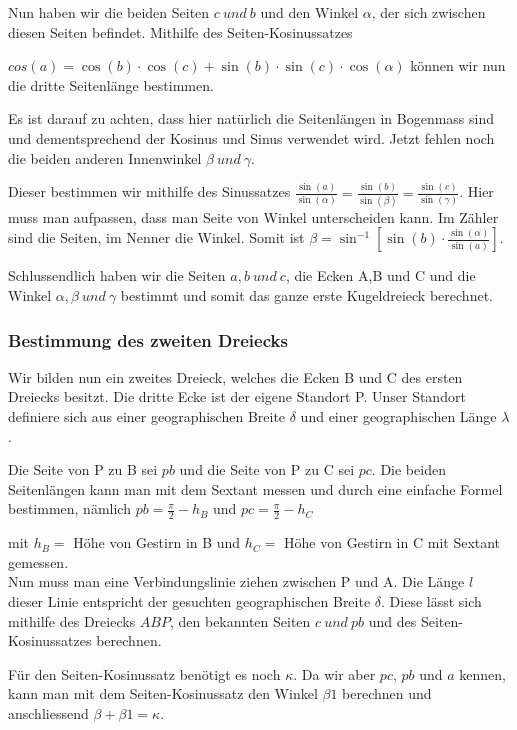 Nun haben wir die beiden Seiten $c\ und\ b$ und den Winkel $\alpha$, der sich zwischen diesen Seiten befindet. 
Mithilfe des Seiten-Kosinussatzes 

$cos(a) = \cos(b)\cdot \cos(c) + \sin(b) \cdot \sin(c)\cdot \cos(\alpha)$ können wir nun die dritte Seitenlänge bestimmen. 

Es ist darauf zu achten, dass hier natürlich die Seitenlängen in Bogenmass sind und dementsprechend der Kosinus und Sinus verwendet wird. 
Jetzt fehlen noch die beiden anderen Innenwinkel $\beta \ und\ \gamma$.

Dieser bestimmen wir mithilfe des Sinussatzes $\frac{\sin (a)}{\sin (\alpha)} =\frac{\sin (b)}{\sin (\beta)} = \frac{\sin (c)}{\sin (\gamma)}$.
Hier muss man aufpassen, dass man Seite von Winkel unterscheiden kann. Im Zähler sind die Seiten, im Nenner die Winkel. Somit ist $\beta =\sin^{-1} [\sin(b) \cdot \frac{\sin(\alpha)}{\sin(a)}] $.

Schlussendlich haben wir die Seiten $a,b\ und \ c$, die Ecken A,B und C und die Winkel $\alpha, \beta \ und \ \gamma$ bestimmt und somit das ganze erste Kugeldreieck berechnet.

\subsubsection{Bestimmung des zweiten Dreiecks}
Wir bilden nun ein zweites Dreieck, welches die Ecken B und C des ersten Dreiecks besitzt. 
Die dritte Ecke ist der eigene Standort P.
Unser Standort definiere sich aus einer geographischen Breite $\delta$ und einer geographischen Länge $\lambda$. 

Die Seite von P zu B sei $pb$ und die Seite von P zu C sei $pc$.
Die beiden Seitenlängen kann man mit dem Sextant messen und durch eine einfache Formel bestimmen, nämlich $pb=\frac{\pi}{2} - h_{B}$ und $pc=\frac{\pi}{2} - h_{C}$ 

mit $h_B=$ Höhe von Gestirn in B und $h_C=$ Höhe von Gestirn in C mit Sextant gemessen.
\\

Nun muss man eine Verbindungslinie ziehen zwischen P und A. Die Länge $l$ dieser Linie entspricht der gesuchten geographischen Breite $\delta$. Diese lässt sich mithilfe des Dreiecks $ABP$, den bekannten Seiten $c\ und \ pb$ und des Seiten-Kosinussatzes berechnen.

Für den Seiten-Kosinussatz benötigt es noch $\kappa$. 
Da wir aber $pc$, $pb$ und $a$ kennen, kann man mit dem Seiten-Kosinussatz den Winkel $\beta1$ berechnen und anschliessend $\beta + \beta1 =\kappa$.

